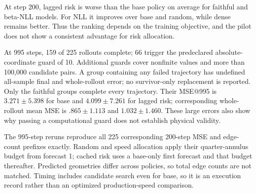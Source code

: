 At step 200, lagged risk is worse than the base policy on average for faithful and beta-NLL models. For NLL it improves over base and random, while dense remains better. Thus the ranking depends on the training objective, and the pilot does not show a consistent advantage for risk allocation.

At 995 steps, 159 of 225 rollouts complete; 66 trigger the predeclared absolute-coordinate guard of 10. Additional guards cover nonfinite values and more than 100,000 candidate pairs. A group containing any failed trajectory has undefined all-sample final and whole-rollout error; no survivor-only replacement is reported. Only the faithful groups complete every trajectory. Their MSE@995 is $3.271\pm5.398$ for base and $4.099\pm7.261$ for lagged risk; corresponding whole-rollout mean MSE is $.865\pm1.113$ and $1.032\pm1.460$. These large errors also show why passing a computational guard does not establish physical validity.

The 995-step reruns reproduce all 225 corresponding 200-step MSE and edge-count prefixes exactly. Random and speed allocation apply their quarter-annulus budget from forecast 1; cached risk uses a base-only first forecast and that budget thereafter. Predicted geometries differ across policies, so total edge counts are not matched. Timing includes candidate search even for base, so it is an execution record rather than an optimized production-speed comparison.

